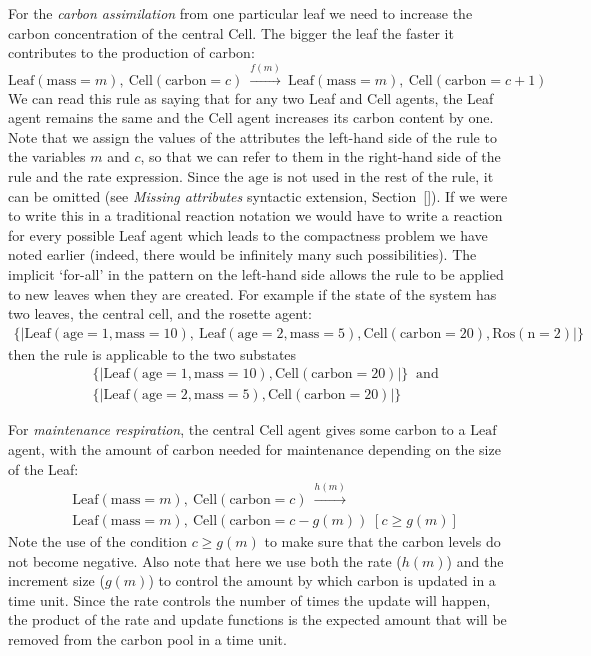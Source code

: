 \documentclass[phd]{infthesis}
\newcommand{\m}[1]{\{\!| #1 |\!\}}
\begin{document}
For the \textit{carbon assimilation} from one particular leaf we need to
increase the carbon concentration of the central Cell. The bigger the leaf the
faster it contributes to the production of carbon:
\[\mathrm{Leaf}(\mathrm{mass}=m), \: \mathrm{Cell}(\mathrm{carbon}=c) \:
\xrightarrow{f(m)} \: \mathrm{Leaf}(\mathrm{mass}=m), \:
\mathrm{Cell}(\mathrm{carbon}=c+1)\]
We can read this rule as saying that for
any two Leaf and Cell agents, the Leaf agent remains the same and the Cell agent
increases its carbon content by one. Note that we assign the values of the
attributes 
the left-hand side of the rule to the variables $m$ and $c$, so that we can
refer to them in the right-hand side of the rule and the rate expression. Since
the $\mathrm{age}$ is not used in the rest of the rule, it can be omitted (see
\textit{Missing attributes} syntactic extension, Section~\ref{}). If
we were to write this in a traditional reaction notation we would have to write
a reaction for every possible Leaf agent which leads to the compactness problem
we have noted earlier (indeed, there would be infinitely many such
possibilities). The implicit `for-all' in the pattern on the left-hand side
allows the rule to be applied to new leaves when they are
created. For example if the state of the system has two leaves, the central
cell, and the rosette agent:
\begin{align*}
\m{ \mathrm{Leaf}(\mathrm{age}=1, \mathrm{mass}=10), \:
\mathrm{Leaf}(\mathrm{age}=2, \mathrm{mass}=5),
\mathrm{Cell}(\mathrm{carbon}=20), \mathrm{Ros}(\mathrm{n} =2)}
\end{align*}
then the rule is applicable to the two substates
\begin{align*}
& \m{\mathrm{Leaf}(\mathrm{age}=1, \mathrm{mass}=10),
                 \mathrm{Cell}(\mathrm{carbon}=20)} \: \text{ and} \\
&\m{\mathrm{Leaf}(\mathrm{age}=2,
  \mathrm{mass}=5), \mathrm{Cell}(\mathrm{carbon}=20)}
\end{align*}

For \textit{maintenance respiration}, the central $\mathrm{Cell}$ agent gives
some carbon to a $\mathrm{Leaf}$ agent, with the amount of carbon needed for
maintenance depending on the size of the Leaf:
%
\begin{align*}
&\mathrm{Leaf}(\mathrm{mass}=m),\: \mathrm{Cell}(\mathrm{carbon}=c) \:
\xrightarrow{h(m)} \\ &\mathrm{Leaf}(\mathrm{mass}=m),\:
\mathrm{Cell}(\mathrm{carbon}=c-g(m)) \; [c \geq g(m)]
\end{align*}
Note the use of the condition $c \geq g(m)$ to make sure that the
carbon levels do not become negative. Also note that here we use both the rate
($h(m)$) and the increment size ($g(m)$) to control the amount by which carbon
is updated in a time unit. Since the rate controls the number of times the
update will happen, the product of the rate and update functions is the expected
amount that will be removed from the carbon pool in a time unit.
\end{document}
